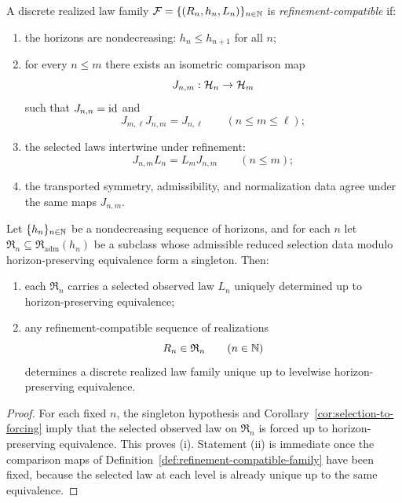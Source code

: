 \begin{definition}
\label{def:refinement-compatible-family}
A discrete realized law family $\mathcal F=\{(R_n,h_n,L_n)\}_{n\in\mathbb{N}}$ is
\emph{refinement-compatible} if:
\begin{enumerate}[label=(\roman*), leftmargin=2em, itemsep=0.2em]
\item the horizons are nondecreasing: $h_n \le h_{n+1}$ for all $n$;
\item for every $n\le m$ there exists an isometric comparison map
      \[
      J_{n,m}:\mathcal{H}_n \to \mathcal{H}_m
      \]
      such that $J_{n,n}=\mathrm{id}$ and
      \[
      J_{m,\ell}J_{n,m}=J_{n,\ell}
      \qquad (n\le m\le \ell);
      \]
\item the selected laws intertwine under refinement:
      \[
      J_{n,m}L_n=L_mJ_{n,m}
      \qquad (n\le m);
      \]
\item the transported symmetry, admissibility, and normalization data agree
      under the same maps $J_{n,m}$.
\end{enumerate}
\end{definition}

\begin{theorem}
\label{thm:forced-discrete-families}
Let $\{h_n\}_{n\in\mathbb{N}}$ be a nondecreasing sequence of horizons, and for each
$n$ let $\mathfrak R_n\subseteq \mathfrak R_{\mathrm{adm}}(h_n)$ be a subclass
whose admissible reduced selection data modulo horizon-preserving equivalence
form a singleton. Then:
\begin{enumerate}[label=(\roman*), leftmargin=2em, itemsep=0.2em]
\item each $\mathfrak R_n$ carries a selected observed law $L_n$ uniquely
      determined up to horizon-preserving equivalence;
\item any refinement-compatible sequence of realizations
      \[
      R_n\in \mathfrak R_n
      \qquad (n\in\mathbb{N})
      \]
      determines a discrete realized law family unique up to levelwise
      horizon-preserving equivalence.
\end{enumerate}
\end{theorem}

\begin{proof}
For each fixed $n$, the singleton hypothesis and
Corollary~\ref{cor:selection-to-forcing} imply that the selected observed law
on $\mathfrak R_n$ is forced up to horizon-preserving equivalence. This proves
(i). Statement (ii) is immediate once the comparison maps of
Definition~\ref{def:refinement-compatible-family} have been fixed, because the
selected law at each level is already unique up to the same equivalence.
\end{proof}

